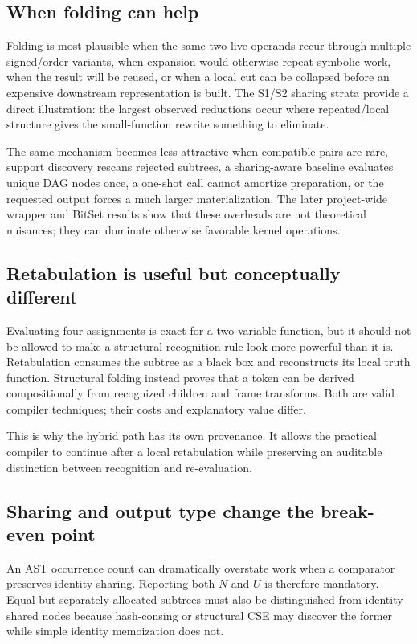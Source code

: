 \documentclass[10pt]{article}
\theoremstyle{plain}
\theoremstyle{definition}
\theoremstyle{remark}
\begin{document}
\subsection{When folding can help}

Folding is most plausible when the same two live operands recur through multiple signed/order variants, when expansion would otherwise repeat symbolic work, when the result will be reused, or when a local cut can be collapsed before an expensive downstream representation is built. The S1/S2 sharing strata provide a direct illustration: the largest observed reductions occur where repeated/local structure gives the small-function rewrite something to eliminate.

The same mechanism becomes less attractive when compatible pairs are rare, support discovery rescans rejected subtrees, a sharing-aware baseline evaluates unique DAG nodes once, a one-shot call cannot amortize preparation, or the requested output forces a much larger materialization. The later project-wide wrapper and BitSet results show that these overheads are not theoretical nuisances; they can dominate otherwise favorable kernel operations.

\subsection{Retabulation is useful but conceptually different}

Evaluating four assignments is exact for a two-variable function, but it should not be allowed to make a structural recognition rule look more powerful than it is. Retabulation consumes the subtree as a black box and reconstructs its local truth function. Structural folding instead proves that a token can be derived compositionally from recognized children and frame transforms. Both are valid compiler techniques; their costs and explanatory value differ.

This is why the hybrid path has its own provenance. It allows the practical compiler to continue after a local retabulation while preserving an auditable distinction between recognition and re-evaluation.

\subsection{Sharing and output type change the break-even point}

An AST occurrence count can dramatically overstate work when a comparator preserves identity sharing. Reporting both $N$ and $U$ is therefore mandatory. Equal-but-separately-allocated subtrees must also be distinguished from identity-shared nodes because hash-consing or structural CSE may discover the former while simple identity memoization does not.
\end{document}
